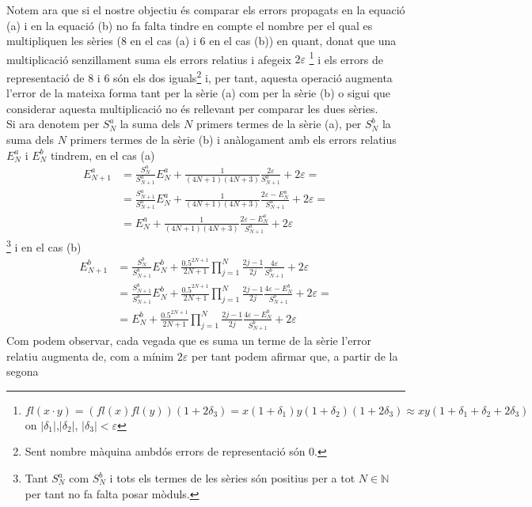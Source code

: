 \documentclass[a4paper,10pt]{article}
\renewcommand{\*}{\cdot}
\renewcommand{\epsilon}{\varepsilon}
\begin{document}
Notem ara que si el nostre objectiu és comparar els errors propagats en la equació (a) i en la equació (b) no fa falta tindre en compte el nombre per el qual es 
multipliquen les sèries (8 en el cas (a) i 6 en el cas (b)) en quant, donat que una multiplicació senzillament suma els errors relatius i afegeix $2\epsilon$
\footnote{$fl(x\*y)=(fl(x)fl(y))(1+2\delta_3)=x(1+\delta_1)y(1+\delta_2)(1+2\delta_3)\approx xy(1+\delta_1+\delta_2+2\delta_3)$ on $|\delta_1|$,$|\delta_2|$,
$|\delta_3|<\epsilon$} i els errors de representació de 8 i 6 són els dos iguals\footnote{Sent nombre màquina ambdós errors de representació són 0.} i, per tant, aquesta 
operació augmenta l'error de la mateixa forma tant per la sèrie (a) com per la sèrie (b) o sigui que considerar aquesta multiplicació no és rellevant per comparar les dues
sèries.\\
Si ara denotem per $S_N^a$ la suma dels $N$ primers termes de la sèrie (a), per $S_N^b$ la suma dels $N$ primers termes de la sèrie (b) i anàlogament
amb els errors relatius $E_N^a$ i $E_N^b$ tindrem, en el cas (a)
\begin{equation}
\label{a}
\begin{split}
 E_{N+1}^a&=\frac{S_N^a}{S_{N+1}^a}E_N^a+\frac{1}{(4N+1)(4N+3)}\frac{2\epsilon}{S^a_{N+1}}+2\epsilon=\\
 &=\frac{S_{N+1}^a}{S_{N+1}^a}E_N^a+\frac{1}{(4N+1)(4N+3)}\frac{2\epsilon-E_N^a}{S^a_{N+1}}+2\epsilon=\\
 &=E_N^a+\frac{1}{(4N+1)(4N+3)}\frac{2\epsilon-E_N^a}{S^a_{N+1}}+2\epsilon
 \end{split}
\end{equation}\footnote{Tant $S^a_N$ com $S^b_N$ i tots els termes de les sèries són positius per a tot $N\in\mathbb{N}$ per tant no fa falta posar mòduls.}
i en el cas (b)
\begin{equation}
\label{b}
\begin{split}
 E_{N+1}^b&=\frac{S_N^b}{S_{N+1}^b}E_N^b+\frac{0.5^{2N+1}}{2N+1}
 \prod_{j=1}^N\frac{2j-1}{2j}\frac{4\epsilon}{S^b_{N+1}}+2\epsilon\\
 &=\frac{S_{N+1}^b}{S_{N+1}^b}E_N^b+\frac{0.5^{2N+1}}{2N+1}
 \prod_{j=1}^N\frac{2j-1}{2j}\frac{4\epsilon-E_N^b}{S^b_{N+1}}+2\epsilon=\\
 &=E_N^b+\frac{0.5^{2N+1}}{2N+1}
 \prod_{j=1}^N\frac{2j-1}{2j}\frac{4\epsilon-E_N^b}{S^b_{N+1}}+2\epsilon
 \end{split}
\end{equation}
Com podem observar, cada vegada que es suma un terme de la sèrie l'error relatiu augmenta de, com a mínim $2\epsilon$ per tant podem afirmar que, a partir de la segona
\end{document}
